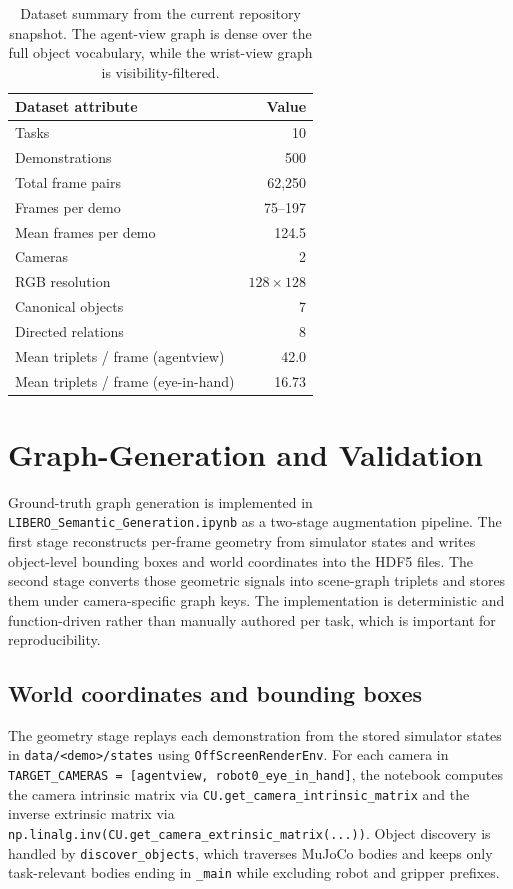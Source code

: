 \documentclass{article}
\begin{document}
\begin{table}[t]
    \caption{Dataset summary from the current repository snapshot. The agent-view graph is dense over the full object vocabulary, while the wrist-view graph is visibility-filtered.}
    \label{tab:dataset-stats}
    \centering
    \begin{tabular}{lr}
        \toprule
        Dataset attribute & Value \\
        \midrule
        Tasks & 10 \\
        Demonstrations & 500 \\
        Total frame pairs & 62,250 \\
        Frames per demo & 75--197 \\
        Mean frames per demo & 124.5 \\
        Cameras & 2 \\
        RGB resolution & $128 \times 128$ \\
        Canonical objects & 7 \\
        Directed relations & 8 \\
        Mean triplets / frame (agentview) & 42.0 \\
        Mean triplets / frame (eye-in-hand) & 16.73 \\
        \bottomrule
    \end{tabular}
\end{table}

\section{Graph-Generation and Validation}
Ground-truth graph generation is implemented in \texttt{LIBERO\_Semantic\_Generation.ipynb} as a two-stage augmentation pipeline. The first stage reconstructs per-frame geometry from simulator states and writes object-level bounding boxes and world coordinates into the HDF5 files. The second stage converts those geometric signals into scene-graph triplets and stores them under camera-specific graph keys. The implementation is deterministic and function-driven rather than manually authored per task, which is important for reproducibility.

\subsection{World coordinates and bounding boxes}
The geometry stage replays each demonstration from the stored simulator states in \texttt{data/<demo>/states} using \texttt{OffScreenRenderEnv}. For each camera in \texttt{TARGET\_CAMERAS = [agentview, robot0\_eye\_in\_hand]}, the notebook computes the camera intrinsic matrix via \texttt{CU.get\_camera\_intrinsic\_matrix} and the inverse extrinsic matrix via \texttt{np.linalg.inv(CU.get\_camera\_extrinsic\_matrix(...))}. Object discovery is handled by \texttt{discover\_objects}, which traverses MuJoCo bodies and keeps only task-relevant bodies ending in \texttt{\_main} while excluding robot and gripper prefixes.
\end{document}
